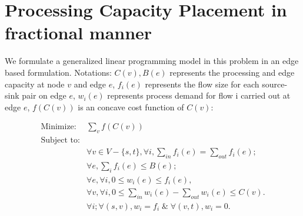 \documentclass[11pt]{article}
\begin{document}
\section{Processing Capacity Placement in fractional manner}
We formulate a generalized linear programming model in this problem in an edge based formulation. Notations: $C(v),B(e)$ represents the processing and edge capacity at node $v$ and edge $e$, $f_i(e)$ represents the flow size for each source-sink pair on edge $e$, $w_i(e)$ represents process demand for flow i carried out at edge $e$, $f(C(v))$ is an concave cost function of $C(v)$: 

\begin{equation*}
\begin{aligned}
\text{Minimize:}&\sum\limits_v f(C(v))\\
\text{Subject to:}&\\
&\forall v \in V-\{s, t\}, \forall i, \sum\limits_{in}  f_i(e)=  \sum\limits_{out} f_i(e);\\
&\forall e, \sum\limits_{i} f_{i}(e)\leq B(e);\\
&\forall e,\forall  i,0 \leq w_i(e) \leq f_i(e),\\
&\forall v,\forall  i, 0\leq \sum\limits_{in } w_i(e) - \sum\limits_{out} w_i(e)   \leq{C(v)}.\\
&\forall  i; \forall (s, v), w_i = f_i\;\&\; \forall (v,t), w_i =0.
\end{aligned}
\end{equation*}







\appendix
\end{document}
